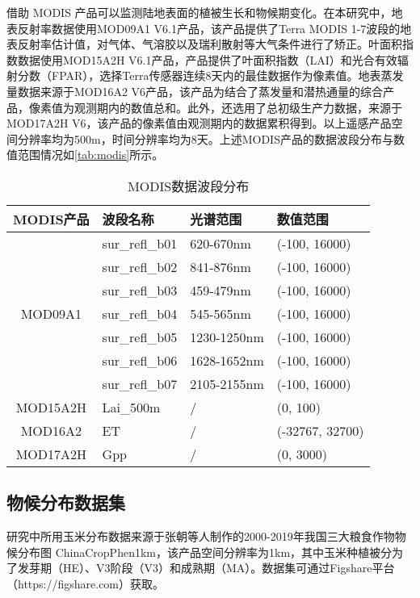 \par 借助 MODIS 产品可以监测陆地表面的植被生长和物候期变化。在本研究中，地表反射率数据使用MOD09A1 V6.1产品，该产品提供了Terra MODIS 1-7波段的地表反射率估计值，对气体、气溶胶以及瑞利散射等大气条件进行了矫正。叶面积指数数据使用MOD15A2H V6.1产品，产品提供了叶面积指数（LAI）和光合有效辐射分数（FPAR），选择Terra传感器连续8天内的最佳数据作为像素值。地表蒸发量数据来源于MOD16A2 V6产品，该产品为结合了蒸发量和潜热通量的综合产品，像素值为观测期内的数值总和。此外，还选用了总初级生产力数据，来源于MOD17A2H V6，该产品的像素值由观测期内的数据累积得到。以上遥感产品空间分辨率均为500m，时间分辨率均为8天。上述MODIS产品的数据波段分布与数值范围情况如\autoref{tab:modis}所示。

\begin{table}
  \centering
  \caption{MODIS数据波段分布}
  \label{tab:modis}
  \begin{tabularx}{\linewidth}{cX<{\centering}X<{\centering}X<{\centering}}
      \toprule
      MODIS产品 & 波段名称 & 光谱范围 & 数值范围 \\
      \midrule
      & sur\_refl\_b01 & 620-670nm & (-100, 16000) \\
      & sur\_refl\_b02 & 841-876nm & (-100, 16000) \\
      & sur\_refl\_b03 & 459-479nm & (-100, 16000) \\
      MOD09A1 & sur\_refl\_b04 & 545-565nm & (-100, 16000) \\
      & sur\_refl\_b05 & 1230-1250nm & (-100, 16000) \\
      & sur\_refl\_b06 & 1628-1652nm & (-100, 16000) \\
      & sur\_refl\_b07 & 2105-2155nm & (-100, 16000) \\ \hline
      MOD15A2H  & Lai\_500m & / & (0, 100) \\ \hline
      MOD16A2   & ET & / & (-32767, 32700) \\ \hline
      MOD17A2H  & Gpp & / & (0, 3000) \\
      \bottomrule
  \end{tabularx}
\end{table}

\subsection{物候分布数据集}
\par 研究中所用玉米分布数据来源于张朝等人制作的2000-2019年我国三大粮食作物物候分布图 ChinaCropPhen1km\cite{luo2020chinacropphen1km}，该产品空间分辨率为1km，其中玉米种植被分为了发芽期（HE）、V3阶段（V3）和成熟期（MA）。数据集可通过Figshare平台（https://figshare.com）获取。

